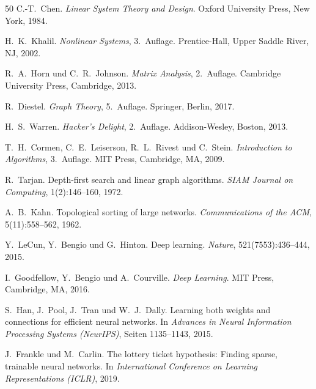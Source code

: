 ﻿\documentclass[a4paper,12pt]{report}
\theoremstyle{definition}
\begin{document}
\begin{thebibliography}{50}
C.-T.~Chen.
\newblock \textit{Linear System Theory and Design}.
\newblock Oxford University Press, New York, 1984.

H.~K.~Khalil.
\newblock \textit{Nonlinear Systems}, 3.~Auflage.
\newblock Prentice-Hall, Upper Saddle River, NJ, 2002.

R.~A.~Horn und C.~R.~Johnson.
\newblock \textit{Matrix Analysis}, 2.~Auflage.
\newblock Cambridge University Press, Cambridge, 2013.

R.~Diestel.
\newblock \textit{Graph Theory}, 5.~Auflage.
\newblock Springer, Berlin, 2017.

H.~S.~Warren.
\newblock \textit{Hacker's Delight}, 2.~Auflage.
\newblock Addison-Wesley, Boston, 2013.

T.~H.~Cormen, C.~E.~Leiserson, R.~L.~Rivest und C.~Stein.
\newblock \textit{Introduction to Algorithms}, 3.~Auflage.
\newblock MIT Press, Cambridge, MA, 2009.

R.~Tarjan.
\newblock Depth-first search and linear graph algorithms.
\newblock \textit{SIAM Journal on Computing}, 1(2):146--160, 1972.

A.~B.~Kahn.
\newblock Topological sorting of large networks.
\newblock \textit{Communications of the ACM}, 5(11):558--562, 1962.

Y.~LeCun, Y.~Bengio und G.~Hinton.
\newblock Deep learning.
\newblock \textit{Nature}, 521(7553):436--444, 2015.

I.~Goodfellow, Y.~Bengio und A.~Courville.
\newblock \textit{Deep Learning}.
\newblock MIT Press, Cambridge, MA, 2016.

S.~Han, J.~Pool, J.~Tran und W.~J.~Dally.
\newblock Learning both weights and connections for efficient neural networks.
\newblock In \textit{Advances in Neural Information Processing Systems (NeurIPS)}, Seiten 1135--1143, 2015.

J.~Frankle und M.~Carlin.
\newblock The lottery ticket hypothesis: Finding sparse, trainable neural networks.
\newblock In \textit{International Conference on Learning Representations (ICLR)}, 2019.


\end{thebibliography}
\end{document}
